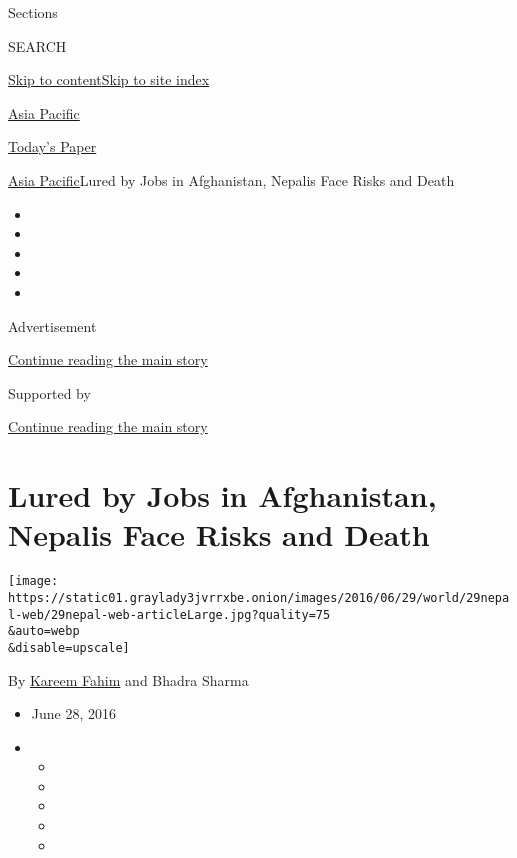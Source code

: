 Sections

SEARCH

\protect\hyperlink{site-content}{Skip to
content}\protect\hyperlink{site-index}{Skip to site index}

\href{https://www.nytimes3xbfgragh.onion/section/world/asia}{Asia
Pacific}

\href{https://myaccount.nytimes3xbfgragh.onion/auth/login?response_type=cookie\&client_id=vi}{}

\href{https://www.nytimes3xbfgragh.onion/section/todayspaper}{Today's
Paper}

\href{/section/world/asia}{Asia Pacific}\textbar{}Lured by Jobs in
Afghanistan, Nepalis Face Risks and Death

\begin{itemize}
\item
\item
\item
\item
\item
\end{itemize}

Advertisement

\protect\hyperlink{after-top}{Continue reading the main story}

Supported by

\protect\hyperlink{after-sponsor}{Continue reading the main story}

\hypertarget{lured-by-jobs-in-afghanistan-nepalis-face-risks-and-death}{%
\section{Lured by Jobs in Afghanistan, Nepalis Face Risks and
Death}\label{lured-by-jobs-in-afghanistan-nepalis-face-risks-and-death}}

\texttt{[image: https://static01.graylady3jvrrxbe.onion/images/2016/06/29/world/29nepal-web/29nepal-web-articleLarge.jpg?quality=75\\\&auto=webp\\\&disable=upscale]}

By \href{https://www.nytimes3xbfgragh.onion/by/kareem-fahim}{Kareem
Fahim} and Bhadra Sharma

\begin{itemize}
\item
  June 28, 2016
\item
  \begin{itemize}
  \item
  \item
  \item
  \item
  \item
  \end{itemize}
\end{itemize}

